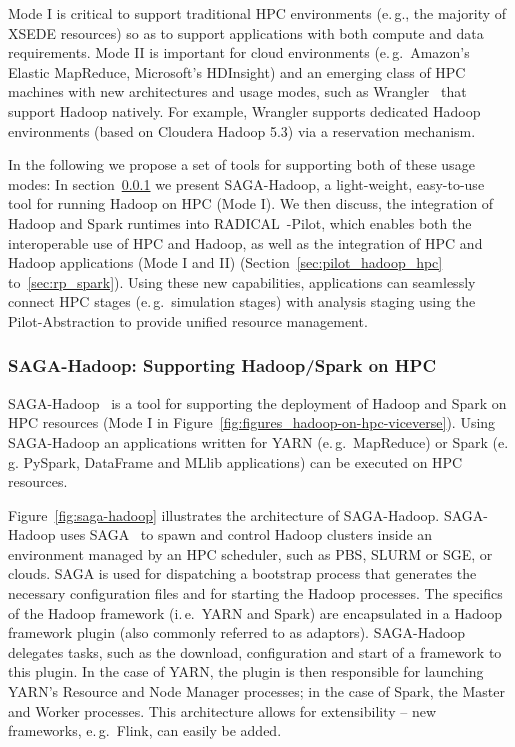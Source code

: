 Mode I is critical to support traditional HPC environments (e.\,g., the majority of XSEDE resources) so as to support applications with both compute and data requirements.
Mode II is important for cloud environments (e.\,g.\ Amazon's Elastic MapReduce, Microsoft's HDInsight) and an emerging class of HPC machines with new architectures and usage modes, such as Wrangler~\cite{wrangler} that support Hadoop natively.
For example, Wrangler supports dedicated Hadoop environments (based on Cloudera Hadoop 5.3) via a reservation mechanism.

In the following we propose a set of tools for supporting both of these usage modes:
In section~\ref{sec:saga_hadoop} we present SAGA-Hadoop, a light-weight, easy-to-use tool for running Hadoop on HPC (Mode I).
We then discuss, the integration of Hadoop and Spark runtimes into RADICAL~-Pilot, which enables both the interoperable use of HPC and Hadoop, as well as the integration of HPC and Hadoop applications (Mode I and II) (Section~\ref{sec:pilot_hadoop_hpc} to~\ref{sec:rp_spark}).
Using these new capabilities, applications can seamlessly connect HPC stages (e.\,g.\ simulation stages) with analysis staging using the Pilot-Abstraction to provide unified resource management.

\subsubsection{SAGA-Hadoop: Supporting Hadoop/Spark on HPC}
\label{sec:saga_hadoop}

SAGA-Hadoop~\cite{saga-hadoop} is a tool for supporting the deployment of Hadoop and Spark on HPC resources (Mode I in Figure~\ref{fig:figures_hadoop-on-hpc-viceverse}).
Using SAGA-Hadoop an applications written for YARN (e.\,g.\ MapReduce) or Spark (e.\,g. PySpark, DataFrame and MLlib applications) can be executed on HPC resources.


Figure~\ref{fig:saga-hadoop} illustrates the architecture of SAGA-Hadoop.
SAGA-Hadoop uses SAGA~\cite{merzky2015saga} to spawn and control Hadoop clusters inside an environment managed by an HPC scheduler, such as PBS, SLURM or SGE, or clouds.
SAGA is used for dispatching a bootstrap process that generates the necessary configuration files and for starting the Hadoop processes.
The specifics of the Hadoop framework (i.\,e.\ YARN and Spark) are encapsulated in a Hadoop framework plugin (also commonly referred to as adaptors).
SAGA-Hadoop delegates tasks, such as the download, configuration and start of a framework to this plugin.
In the case of YARN, the plugin is then responsible for launching YARN's Resource and Node Manager processes; in the case of Spark, the Master and Worker processes.
This architecture allows for extensibility -- new frameworks, e.\,g.\ Flink, can easily be added.



